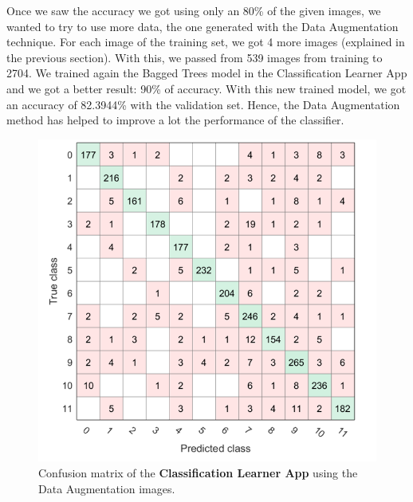 \documentclass[11]{article}
\begin{document}
Once we saw the accuracy we got using only an 80\% of the given images, we wanted to try to use more data, the one generated with the Data Augmentation technique. For each image of the training set, we got 4 more images (explained in the previous section). With this, we passed from 539 images from training to 2704. We trained again the Bagged Trees model in the Classification Learner App and we got a better result: 90\% of accuracy. With this new trained model, we got an accuracy of 82.3944\% with the validation set. Hence, the Data Augmentation method has helped to improve a lot the performance of the classifier.

\begin{figure}[H]
\centering
\hspace{-0.5cm}
\begin{minipage}{0.4\linewidth}
  \centering
  \includegraphics[scale=0.45]{images/secondmatrix.PNG}
  \caption{Confusion matrix of the \textbf{Classification Learner App} using the Data Augmentation images.}
  \label{plot:exe-gauss}
\end{minipage}%
\hspace{1.5cm}
\begin{minipage}{0.4\linewidth}
  \centering

\end{minipage}
\end{figure}
\end{document}
